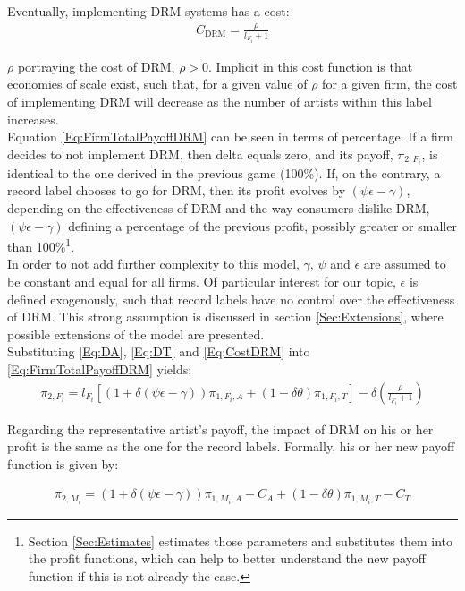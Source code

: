 \documentclass[a4paper,12pt]{article}
\numberwithin{equation}{section}
\newcommand{\drm}{\text{DRM}}
\newcommand{\artistpayoff}[2]{\pi_{#1, M_{#2}}}
\newcommand{\firmpayoff}[2]{\pi_{{#1}, F_{#2}}}
\newcommand{\artistalbum}[2]{\pi_{#1, M_{#2}, A}}
\newcommand{\artistticket}[2]{\pi_{#1, M_{#2}, T}}
\newcommand{\firmalbum}[2]{\pi_{#1, F_{#2}, A}}
\newcommand{\firmticket}[2]{\pi_{#1, F_{#2}, T}}
\newcommand{\drminf}{(\psi \epsilon - \gamma)}
\begin{document}
Eventually, implementing DRM systems has a cost:
\begin{eqnarray}
C_\drm = \frac{\rho}{l_{F_i} + 1}
\label{Eq:CostDRM}
\end{eqnarray}

$\rho$ portraying the cost of DRM, $\rho > 0$. Implicit in this cost function is that economies of scale exist, such that, for a given value of $\rho$ for a given firm, the cost of implementing DRM will decrease as the number of artists within this label increases.\\

Equation \eqref{Eq:FirmTotalPayoffDRM} can be seen in terms of percentage. If a firm decides to not implement DRM, then delta equals zero, and its payoff, $\firmpayoff{2}{i}$, is identical to the one derived in the previous game (100\%). If, on the contrary, a record label chooses to go for DRM, then its profit evolves by $\drminf$, depending on the effectiveness of DRM and the way consumers dislike DRM, $\drminf$ defining a percentage of the previous profit, possibly greater or smaller than 100\%\footnote {
Section \ref{Sec:Estimates} estimates those parameters and substitutes them into the profit functions, which can help to better understand the new payoff function if this is not already the case.
}.\\

In order to not add further complexity to this model, $\gamma$, $\psi$ and $\epsilon$ are assumed to be constant and equal for all firms. Of particular interest for our topic, $\epsilon$ is defined exogenously, such that record labels have no control over the effectiveness of DRM. This strong assumption is discussed in section \ref{Sec:Extensions}, where possible extensions of the model are presented.\\

Substituting \eqref{Eq:DA}, \eqref{Eq:DT} and \eqref{Eq:CostDRM} into \eqref{Eq:FirmTotalPayoffDRM} yields:
\begin{eqnarray}
\firmpayoff{2}{i} = l_{F_i} \left[
	(1 + \delta \drminf) \firmalbum{1}{i} +
	(1 - \delta \theta) \firmticket{1}{i}
\right]
- \delta \left( \frac{\rho}{l_{F_i} + 1} \right)
\end{eqnarray}

Regarding the representative artist’s payoff, the impact of DRM on his or her profit is the same as the one for the record labels. Formally, his or her new payoff function is given by:

\begin{eqnarray}
\artistpayoff{2}{i} = (1 + \delta \drminf) \artistalbum{1}{i} - C_A +
						(1 - \delta \theta) \artistticket{1}{i} - C_T
\end{eqnarray}
\end{document}
